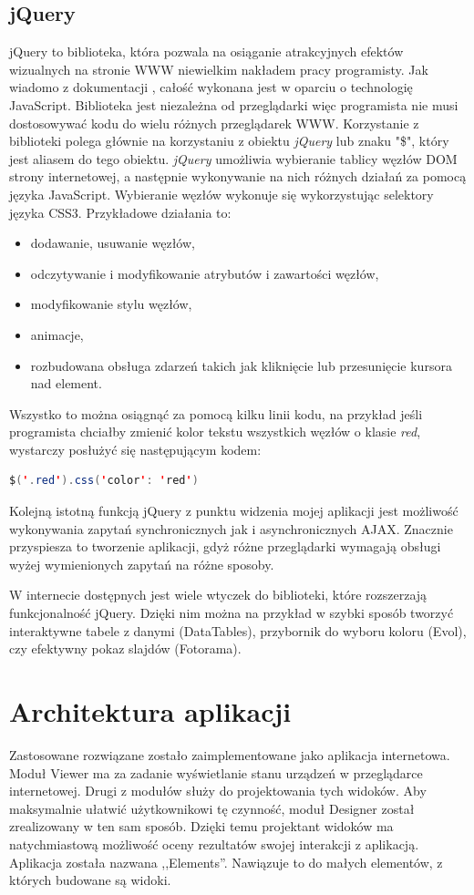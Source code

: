 \subsection{jQuery}
jQuery to biblioteka, która pozwala na osiąganie atrakcyjnych efektów wizualnych na stronie WWW niewielkim nakładem pracy programisty. Jak wiadomo z dokumentacji \cite{jquery-doc}, całość wykonana jest w oparciu o technologię JavaScript. Biblioteka jest niezależna od przeglądarki więc programista nie musi dostosowywać kodu do wielu różnych przeglądarek WWW. Korzystanie z biblioteki polega głównie na korzystaniu z obiektu \textit{jQuery} lub znaku "\$", który jest aliasem do tego obiektu. \textit{jQuery} umożliwia wybieranie tablicy węzłów DOM strony internetowej, a następnie wykonywanie na nich różnych działań za pomocą języka JavaScript. Wybieranie węzłów wykonuje się wykorzystując selektory języka CSS3. Przykładowe działania to:
\begin{itemize}
\item dodawanie, usuwanie węzłów,
\item odczytywanie i modyfikowanie atrybutów i zawartości węzłów,
\item modyfikowanie stylu węzłów,
\item animacje,
\item rozbudowana obsługa zdarzeń takich jak kliknięcie lub przesunięcie kursora nad element.
\end{itemize}
Wszystko to można osiągnąć za pomocą kilku linii kodu, na przykład jeśli programista chciałby zmienić kolor tekstu wszystkich węzłów o klasie \textit{red}, wystarczy posłużyć się następującym kodem:
\begin{lstlisting}[language=Java]
$('.red').css('color': 'red')
\end{lstlisting}
Kolejną istotną funkcją jQuery z punktu widzenia mojej aplikacji jest możliwość wykonywania zapytań synchronicznych jak i asynchronicznych AJAX. Znacznie przyspiesza to tworzenie aplikacji, gdyż różne przeglądarki wymagają obsługi wyżej wymienionych zapytań na różne sposoby. 

W internecie dostępnych jest wiele wtyczek do biblioteki, które rozszerzają funkcjonalność jQuery. Dzięki nim można na przykład w szybki sposób tworzyć interaktywne tabele z danymi (DataTables), przybornik do wyboru koloru (Evol), czy efektywny pokaz slajdów (Fotorama).

\section{Architektura aplikacji}
Zastosowane rozwiązane zostało zaimplementowane jako aplikacja internetowa. Moduł Viewer ma za zadanie wyświetlanie stanu urządzeń w przeglądarce internetowej. Drugi z modułów służy do projektowania tych widoków. Aby maksymalnie ułatwić użytkownikowi tę czynność, moduł Designer został zrealizowany w ten sam sposób. Dzięki temu projektant widoków ma natychmiastową możliwość oceny rezultatów swojej interakcji z aplikacją. Aplikacja została nazwana ,,Elements''. Nawiązuje to do małych elementów, z których budowane są widoki. 

